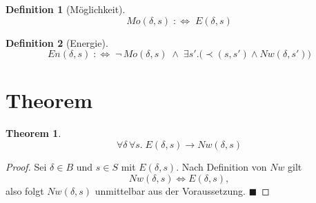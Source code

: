 \documentclass[11pt]{article}
\newtheorem{definition}{Definition}
\newtheorem{theorem}{Theorem}
\begin{document}
\begin{definition}[Möglichkeit]
$$Mo(\delta,s) \;:\Longleftrightarrow\; E(\delta,s)$$
\end{definition}

\begin{definition}[Energie]
$$En(\delta,s) \;:\Longleftrightarrow\; \neg\, Mo(\delta,s) \;\wedge\; \exists s'.\big(\prec(s,s') \wedge Nw(\delta,s')\big)$$
\end{definition}

\section*{Theorem}

\begin{theorem}
$$\forall \delta \, \forall s.\; E(\delta,s) \rightarrow Nw(\delta,s)$$
\end{theorem}

\begin{proof}
Sei $\delta \in B$ und $s \in S$ mit $E(\delta,s)$. Nach Definition von $Nw$ gilt
$$Nw(\delta,s) \Longleftrightarrow E(\delta,s),$$
also folgt $Nw(\delta,s)$ unmittelbar aus der Voraussetzung. $\blacksquare$
\end{proof}
\end{document}
